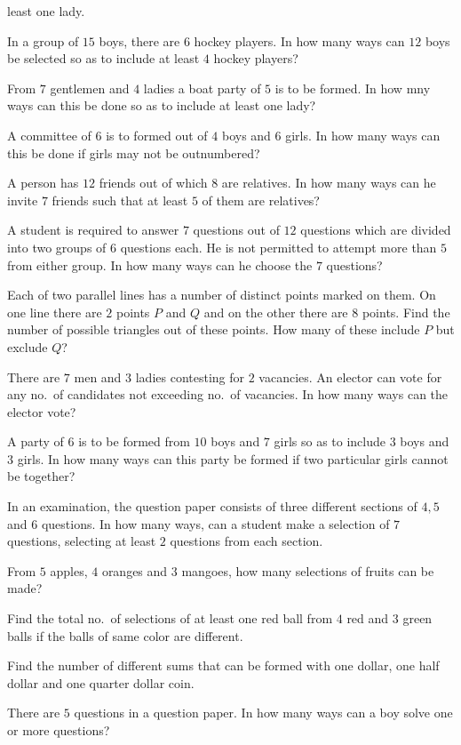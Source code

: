   least one lady.
\item In a group of $15$ boys, there are $6$ hockey players. In how many ways can $12$ boys be selected so as to include at least
  $4$ hockey players?
\item From $7$ gentlemen and $4$ ladies a boat party of $5$ is to be formed. In how mny ways can this be done so as to include at
  least one lady?
\item A committee of $6$ is to formed out of $4$ boys and $6$ girls. In how many ways can this be done if girls may not be
  outnumbered?
\item A person has $12$ friends out of which $8$ are relatives. In how many ways can he invite $7$ friends such that at least $5$ of
  them are relatives?
\item A student is required to answer $7$ questions out of $12$ questions which are divided into two groups of $6$ questions
  each. He is not permitted to attempt more than $5$ from either group. In how many ways can he choose the $7$ questions?
\item Each of two parallel lines has a number of distinct points marked on them. On one line there are $2$ points $P$ and $Q$ and
  on the other there are $8$ points. Find the number of possible triangles out of these points. How many of these include $P$ but
  exclude $Q$?
\item There are $7$ men and $3$ ladies contesting for $2$ vacancies. An elector can vote for any no.\ of candidates not exceeding
  no.\ of vacancies. In how many ways can the elector vote?
\item A party of $6$ is to be formed from $10$ boys and $7$ girls so as to include $3$ boys and $3$ girls. In how many ways can
  this party be formed if two particular girls cannot be together?
\item In an examination, the question paper consists of three different sections of $4, 5$ and $6$ questions. In how many ways, can
  a student make a selection of $7$ questions, selecting at least $2$ questions from each section.
\item From $5$ apples, $4$ oranges and $3$ mangoes, how many selections of fruits can be made?
\item Find the total no.\ of selections of at least one red ball from $4$ red and $3$ green balls if the balls of same color are
  different.
\item Find the number of different sums that can be formed with one dollar, one half dollar and one quarter dollar coin.
\item There are $5$ questions in a question paper. In how many ways can a boy solve one or more questions?
